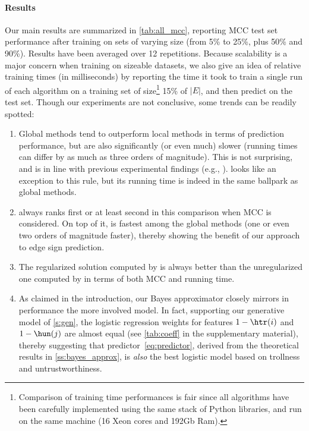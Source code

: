 \paragraph{Results}
Our main results are summarized in \autoref{tab:all_mcc}, reporting MCC test set performance after
training on sets of varying size (from 5\% to 25\%, plus 50\% and 90\%). Results have been averaged
over 12 repetitions.
Because scalability is a major concern when training on sizeable datasets, we also give an idea of
relative training times (in milliseconds) by reporting the time it took to train a single run of
each algorithm on a training set of size\footnote{Comparison of training time performances is fair
since all algorithms have been carefully implemented using the same stack of Python libraries, and
run on the same machine (16 Xeon cores and 192Gb Ram).} 15\% of $|E|$, and then predict on the test
set. Though our experiments are not conclusive, some trends can be readily spotted:

\begin{enumerate}[leftmargin=2em,label=\textbf{\arabic*.}]

  \item Global methods tend to outperform local methods in terms of prediction performance, but are
    also significantly (or even much) slower (running times can differ by as much as three orders of
    magnitude). This is not surprising, and is in line with previous experimental findings (e.g.,
    \autocites{shahriari2014ranking}{wu2016troll}). \compbayesian{} looks like an exception to this
    rule, but its running time is indeed in the same ballpark as global methods.

  \item \uslpropGsec{} always ranks first or at least second in this comparison when MCC is
    considered. On top of it, \uslpropGsec{} is fastest among the global methods (one or even two
    orders of magnitude faster), thereby showing the benefit of our approach to edge sign
    prediction.

  \item The regularized solution computed by \uslpropGsec{} is always better than the unregularized
    one computed by \qoptim{} in terms of both MCC and running time.

  \item As claimed in the introduction, our Bayes approximator \usrule{} closely mirrors in
    performance the more involved \uslogregp{} model. In fact, supporting our generative model of
    \autoref{s:gen}, the logistic regression weights for features $1-\htr(i)$ and $1-\hun(j)$
    are almost equal (see \autoref{tab:coeff} in the supplementary material), thereby suggesting that
    predictor~\eqref{eq:predictor}, derived from the theoretical results in
    \autoref{ss:bayes_approx}, is \emph{also} the best logistic model based on trollness and
    untrustworthiness.
\end{enumerate}

